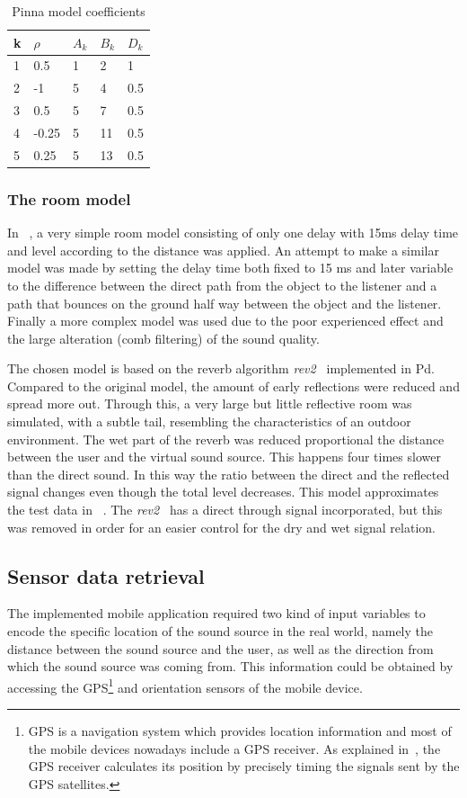 \documentclass[journal]{IEEEtran}
\begin{document}
\begin{table}[h]
\centering
\caption{Pinna model coefficients}
\label{PinnaModel parameters}
\begin{tabular}{|l|l|l|l|l|}
\hline
k & $\rho$ & $A_{k}$ & $B_{k}$ & $D_{k}$ \\ \hline
1 & 0.5 & 1 & 2 & 1 \\ \hline
2 & -1 & 5 & 4 & 0.5 \\ \hline
3 & 0.5 & 5 & 7 & 0.5 \\ \hline
4 & -0.25 & 5 & 11 & 0.5 \\ \hline
5 & 0.25 & 5 & 13 & 0.5 \\ \hline
\end{tabular}
\end{table}



\subsubsection{The room model}
In ~\cite{Brown1997}, a very simple room model consisting of only one delay with 15ms delay time and level according to the distance was applied. An attempt to make a similar model was made by setting the delay time both fixed to 15 ms and later variable to the difference between the direct path from the object to the listener and a path that bounces on the ground half way between the object and the listener. Finally a more complex model was used due to the poor experienced effect and the large alteration (comb filtering) of the sound quality.

The chosen model is based on the reverb algorithm \textit{rev2~} implemented in Pd. Compared to the original model, the amount of early reflections were reduced and spread more out. Through this, a very large but little reflective room was simulated, with a subtle tail, resembling the characteristics of an outdoor environment. The wet part of the reverb was reduced proportional the distance between the user and the virtual sound source. This happens four times slower than the direct sound. In this way the ratio between the direct and the reflected signal changes even though the total level decreases. This model approximates the test data in ~\cite{begault19943}. The \textit{rev2~} has a direct through signal incorporated, but this was removed in order for an easier control for the dry and wet signal relation.


\subsection{Sensor data retrieval}
The implemented mobile application required two kind of input variables to encode the specific location of the sound source in the real world, namely the distance between the sound source and the user, as well as the direction from which the sound source was coming from. This information could be obtained by accessing the GPS\footnote{GPS is a navigation system which provides location information and most of the mobile devices nowadays include a GPS receiver. As explained in~\cite{noble2009}, the GPS receiver calculates its position by precisely timing the signals sent by the GPS satellites.} and orientation sensors of the mobile device. 
\end{document}
